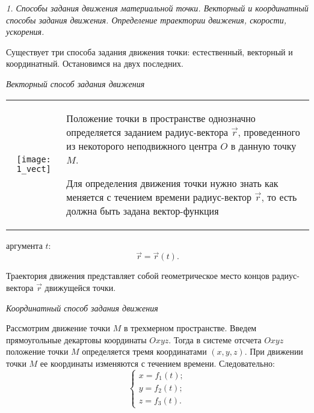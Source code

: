 



\newcommand{\header}[1]{\vspace*{.3em}\emph{#1}\vspace*{.2em}}
\newcommand{\Der}[2]{\frac{\Delta #1}{\Delta #2}}
\newcommand{\defeq}{\stackrel{\mathrm{def}}{=}}
\newcommand{\D}{\,\Delta}


\emph{1. Способы задания движения материальной точки. Векторный и координатный
способы задания движения. Определение траектории движения, скорости, ускорения.}

\vspace*{1em}
Существует три способа задания движения точки: естественный, векторный и
координатный. Остановимся на двух последних.

\header{Векторный способ задания движения}
\begin{table}[h!]
    \begin{tabular}{C{.4}m{.55\textwidth}}
        \texttt{[image: 1\_vect]} &
        Положение точки в пространстве однозначно определяется заданием
        радиус-вектора \( \vec{r} \), проведенного из некоторого неподвижного
        центра \( O \) в данную точку \( M \).
        
        Для определения движения точки нужно знать как меняется с течением
        времени радиус-вектор \( \vec{r} \), то есть должна быть задана
        вектор-функция
    \end{tabular}
\end{table}

аргумента \( t \):
\[
    \vec{r} = \vec{r}(t).
\]

Траектория движения представляет собой геометрическое место концов
радиус-вектора \( \vec{r} \) движущейся точки.

\header{Координатный способ задания движения}

Рассмотрим движение точки \( M \) в трехмерном пространстве. Введем
прямоугольные декартовы координаты \( Oxyz \). Тогда в системе отсчета
\( Oxyz \) положение точки \( M \) определяется тремя координатами
\( (x, y, z) \). При движении точки \( M \) ее координаты изменяются с течением
времени. Следовательно:
\[ \left\{ \begin{array}{l}
    x = f_1(t); \\
    y = f_2(t); \\
    z = f_3(t).
\end{array} \right. \]

